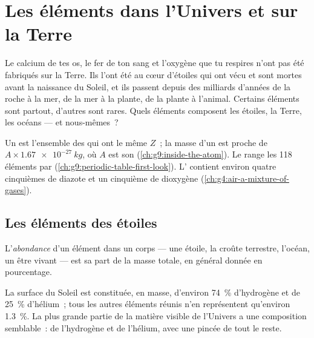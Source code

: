 \chapter{Les éléments dans l'Univers et sur la Terre}\label{ch:g9:elements-universe-earth}

Le calcium de tes os, le fer de ton sang et l'oxygène que tu respires
n'ont pas été fabriqués sur la Terre. Ils l'ont été au cœur d'étoiles qui
ont vécu et sont mortes avant la naissance du Soleil, et ils passent
depuis des milliards d'années de la roche à la mer, de la mer à la
plante, de la plante à l'animal. Certains éléments sont partout,
d'autres sont rares. Quels éléments composent les étoiles, la Terre, les
océans --- et nous-mêmes~?

\begin{recall}
Un  est l'ensemble des  qui ont le même  $Z$~; la masse d'un  est proche de
$A \times \qty{1.67e-27}{kg}$, où $A$ est son 
(\cref{ch:g9:inside-the-atom}). Le  range les
118 éléments par 
(\cref{ch:g9:periodic-table-first-look}). L' contient environ quatre
cinquièmes de diazote et un cinquième de dioxygène
(\cref{ch:g4:air-a-mixture-of-gases}).
\end{recall}

\section{Les éléments des étoiles}

\begin{definition}[Abondance]\label{def:g9:elements-universe-earth:abundance}
L'\emph{abondance} d'un élément dans un corps --- une
étoile, la croûte terrestre, l'océan, un être vivant --- est sa part de
la masse totale, en général donnée en pourcentage.
\end{definition}

\begin{proposition}\label{prop:g9:elements-universe-earth:sun}
La surface du Soleil est constituée, en masse, d'environ
\qty{74}{\percent} d'hydrogène et de \qty{25}{\percent} d'hélium~; tous
les autres éléments réunis n'en représentent qu'environ
\qty{1.3}{\percent}. La plus grande partie de la matière visible de
l'Univers a une composition semblable~: de l'hydrogène et de l'hélium,
avec une pincée de tout le reste.
\end{proposition}

